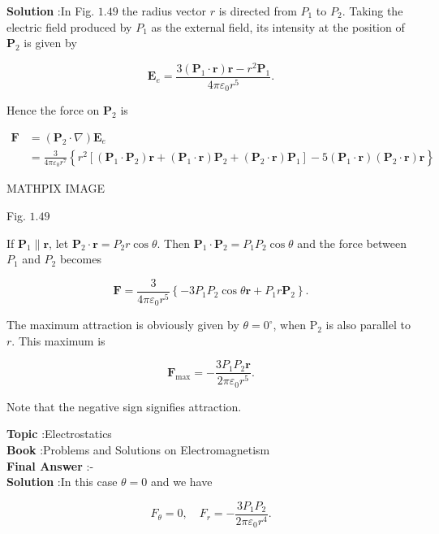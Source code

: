 \documentclass[10pt]{article}
\begin{document}
\textbf{Solution} :In Fig. $1.49$ the radius vector $r$ is directed from $P_{1}$ to $P_{2}$. Taking the electric field produced by $P_{1}$ as the external field, its intensity at the position of $\mathbf{P}_{2}$ is given by

$$
\mathbf{E}_{e}=\frac{3\left(\mathbf{P}_{1} \cdot \mathbf{r}\right) \mathbf{r}-r^{2} \mathbf{P}_{1}}{4 \pi \varepsilon_{0} r^{5}} .
$$

Hence the force on $\mathbf{P}_{2}$ is

$$
\begin{aligned}
\mathbf{F} &=\left(\mathbf{P}_{2} \cdot \nabla\right) \mathbf{E}_{e} \\
&=\frac{3}{4 \pi \varepsilon_{0} r^{7}}\left\{r^{2}\left[\left(\mathbf{P}_{1} \cdot \mathbf{P}_{2}\right) \mathbf{r}+\left(\mathbf{P}_{1} \cdot \mathbf{r}\right) \mathbf{P}_{2}+\left(\mathbf{P}_{2} \cdot \mathbf{r}\right) \mathbf{P}_{1}\right]-5\left(\mathbf{P}_{1} \cdot \mathbf{r}\right)\left(\mathbf{P}_{2} \cdot \mathbf{r}\right) \mathbf{r}\right\}
\end{aligned}
$$

MATHPIX IMAGE

Fig. $1.49$

If $\mathbf{P}_{1} \| \mathbf{r}$, let $\mathbf{P}_{2} \cdot \mathbf{r}=P_{2} r \cos \theta$. Then $\mathbf{P}_{1} \cdot \mathbf{P}_{2}=P_{1} P_{2} \cos \theta$ and the force between $P_{1}$ and $P_{2}$ becomes

$$
\mathbf{F}=\frac{3}{4 \pi \varepsilon_{0} r^{5}}\left\{-3 P_{1} P_{2} \cos \theta \mathbf{r}+P_{1} r \mathbf{P}_{2}\right\} .
$$

The maximum attraction is obviously given by $\theta=0^{\circ}$, when $\mathrm{P}_{2}$ is also parallel to $r$. This maximum is

$$
\mathbf{F}_{\max }=-\frac{3 P_{1} P_{2} \mathbf{r}}{2 \pi \varepsilon_{0} r^{5}} .
$$

Note that the negative sign signifies attraction. 

\textbf{Topic} :Electrostatics\\
\textbf{Book} :Problems and Solutions on Electromagnetism\\
\textbf{Final Answer} :-\\


\textbf{Solution} :In this case $\theta=0$ and we have

$$
F_{\theta}=0, \quad F_{r}=-\frac{3 P_{1} P_{2}}{2 \pi \varepsilon_{0} r^{4}} .
$$
\end{document}
